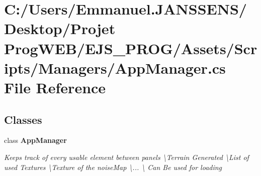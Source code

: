 \section{C\+:/\+Users/\+Emmanuel.J\+A\+N\+S\+S\+E\+N\+S/\+Desktop/\+Projet Prog\+W\+E\+B/\+E\+J\+S\+\_\+\+P\+R\+O\+G/\+Assets/\+Scripts/\+Managers/\+App\+Manager.cs File Reference}
\label{_app_manager_8cs}
\subsection*{Classes}
\begin{DoxyCompactItemize}
\item 
class \textbf{ App\+Manager}
\begin{DoxyCompactList}\small\item\em Keeps track of every usable element between panels \textbackslash{}Terrain Generated \textbackslash{}List of used Textures \textbackslash{}Texture of the noise\+Map \textbackslash{}... \textbackslash{} Can Be used for loading \end{DoxyCompactList}\end{DoxyCompactItemize}
